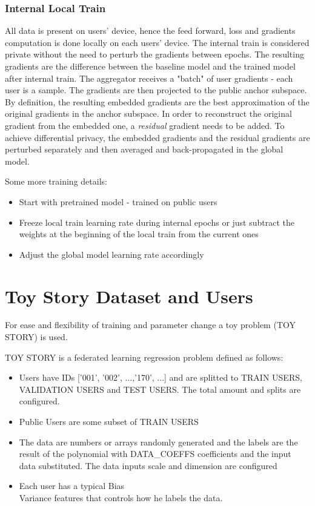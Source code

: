  \subsubsection{Internal Local Train}
 All data is present on users' device, hence the feed forward, loss and gradients computation is done locally on each users' device.
 The internal train is considered private without the need to perturb the gradients between epochs. The resulting gradients are the difference between the baseline model and the trained model after internal train. The aggregator receives a "batch" of user gradients - each user is a sample. The gradients are then projected to the public anchor subspace. By definition, the resulting embedded gradients are the best approximation of the original gradients in the anchor subspace. In order to reconstruct the original gradient from the embedded one, a \textit{residual} gradient needs to be added. To achieve differential privacy, the embedded gradients and the residual gradients are perturbed separately and then averaged and back-propagated in the global model.

Some more training details:
\begin{itemize}
    \item Start with pretrained model - trained on public users
    \item Freeze local train learning rate during internal epochs or just subtract the weights at the beginning of the local train from the current ones
    \item Adjust the global model learning rate accordingly
\end{itemize}


\section{Toy Story Dataset and Users}
For ease and flexibility of training and parameter change a toy problem (TOY STORY) is used.

TOY STORY is a federated learning regression problem defined as follows:
\begin{itemize}
    \item Users have IDs ['001', '002', ...,'170', ...] and are splitted to TRAIN USERS, VALIDATION USERS and TEST USERS. The total amount and splits are configured.
    \item Public Users are some subset of TRAIN USERS
    \item The data are numbers or arrays randomly generated and the labels are the result of the polynomial with DATA\_COEFFS coefficients and the input data substituted. The data inputs scale and dimension are configured
    \item Each user has a typical Bias\\Variance features that controls how he labels the data. 
\end{itemize}

